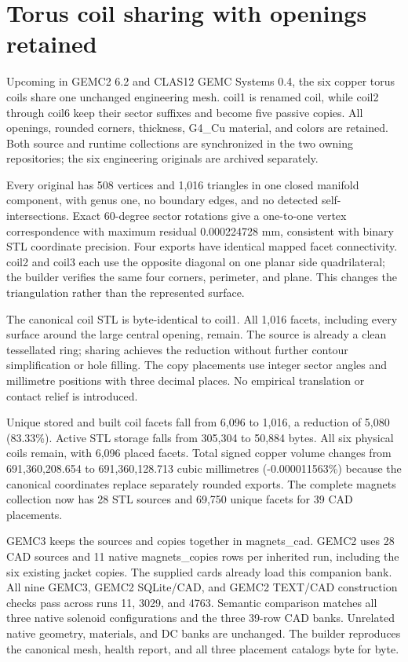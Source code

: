 \FloatBarrier
\section{Torus coil sharing with openings retained}
\label{sec:coils}

Upcoming in GEMC2 6.2 and CLAS12 GEMC Systems 0.4, the six copper torus coils share one unchanged engineering
mesh. coil1 is renamed coil, while coil2 through coil6 keep their sector suffixes and become five passive
copies. All openings, rounded corners, thickness, G4\_Cu material, and colors are retained. Both source and
runtime collections are synchronized in the two owning repositories; the six engineering originals are
archived separately.

Every original has 508 vertices and 1,016 triangles in one closed manifold component, with genus one, no
boundary edges, and no detected self-intersections. Exact 60-degree sector rotations give a one-to-one vertex
correspondence with maximum residual 0.000224728 mm, consistent with binary STL coordinate precision. Four
exports have identical mapped facet connectivity. coil2 and coil3 each use the opposite diagonal on one planar
side quadrilateral; the builder verifies the same four corners, perimeter, and plane. This changes the
triangulation rather than the represented surface.

The canonical coil STL is byte-identical to coil1. All 1,016 facets, including every surface around the large
central opening, remain. The source is already a clean tessellated ring; sharing achieves the reduction
without further contour simplification or hole filling. The copy placements use integer sector angles and
millimetre positions with three decimal places. No empirical translation or contact relief is introduced.

Unique stored and built coil facets fall from 6,096 to 1,016, a reduction of 5,080 (83.33\%). Active STL
storage falls from 305,304 to 50,884 bytes. All six physical coils remain, with 6,096 placed facets. Total
signed copper volume changes from 691,360,208.654 to 691,360,128.713 cubic millimetres (-0.000011563\%)
because the canonical coordinates replace separately rounded exports. The complete magnets collection now has
28 STL sources and 69,750 unique facets for 39 CAD placements.

GEMC3 keeps the sources and copies together in magnets\_cad. GEMC2 uses 28 CAD sources and 11 native
magnets\_copies rows per inherited run, including the six existing jacket copies. The supplied cards already
load this companion bank. All nine GEMC3, GEMC2 SQLite/CAD, and GEMC2 TEXT/CAD construction checks pass across
runs 11, 3029, and 4763. Semantic comparison matches all three native solenoid configurations and the three
39-row CAD banks. Unrelated native geometry, materials, and DC banks are unchanged. The builder reproduces the
canonical mesh, health report, and all three placement catalogs byte for byte.

